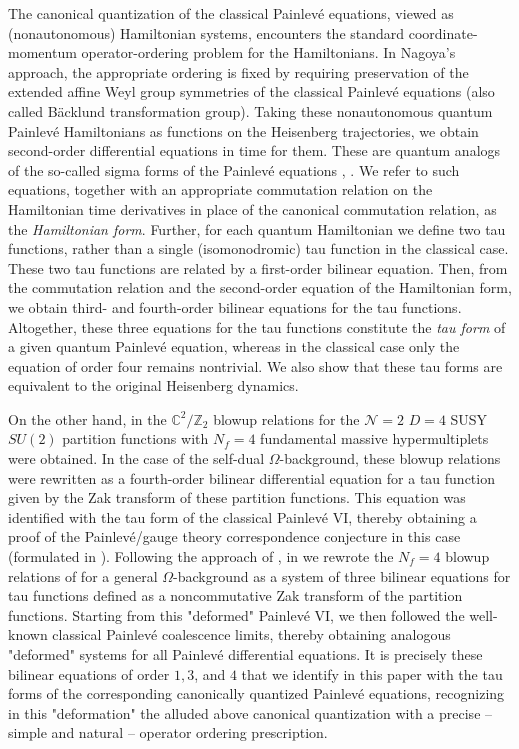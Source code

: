 \documentclass[12pt,a4paper]{article}
\numberwithin{equation}{section}
\begin{document}
The canonical quantization of the classical Painlev\'e equations, viewed as (nonautonomous) Hamiltonian systems, encounters the standard coordinate-momentum operator-ordering problem for the Hamiltonians. In Nagoya's approach, the appropriate ordering is fixed by requiring preservation of the extended affine Weyl group  symmetries of the classical Painlev\'e equations (also called B\"acklund transformation group). Taking these nonautonomous quantum Painlev\'e Hamiltonians as functions on the Heisenberg trajectories, we obtain second-order differential equations in time for them. These are quantum analogs of the so-called sigma forms of the Painlev\'e equations \cite{JM81}, \cite{Forrester_book}. We refer to such equations, together with an appropriate commutation relation on the Hamiltonian time derivatives in place of the canonical commutation relation, as the \textit{Hamiltonian form}. Further, for each quantum Hamiltonian we define two tau functions, rather than a single (isomonodromic) tau function in the classical case.
These two tau functions are related by a first-order bilinear equation. Then, from the commutation relation and the second-order equation of the Hamiltonian form, we obtain third- and fourth-order bilinear equations for the tau functions. Altogether, these three equations for the tau functions constitute the \textit{tau form} of a given quantum Painlev\'e equation, whereas in the classical case only the equation of order four remains nontrivial. We also show that these tau forms are equivalent to the original Heisenberg dynamics.

On the other hand, in \cite{BS14} the $\mathbb{C}^2/\mathbb{Z}_2$ blowup relations for the $\mathcal{N}=2$ $D=4$ SUSY $SU(2)$ partition functions with $N_f=4$ fundamental massive hypermultiplets were obtained.
In the case of the self-dual $\Omega$-background, these blowup relations were rewritten
as a fourth-order bilinear differential equation for a tau function given by the Zak transform of these partition functions.
This equation was identified with the tau form of the classical Painlev\'e VI, thereby obtaining a proof of the Painlev\'e/gauge theory correspondence conjecture in this case (formulated in \cite{GIL12}). Following the approach of \cite{BGM17}, in \cite{BST25} we rewrote the $N_f=4$ blowup relations of \cite{BS14} for a general $\Omega$-background as a system of three bilinear equations for tau functions defined as a noncommutative Zak transform of the partition functions. 
Starting from this "deformed" Painlev\'e VI, we then followed the well-known classical Painlev\'e coalescence limits, thereby obtaining analogous "deformed" systems for all Painlev\'e differential equations.
It is precisely these bilinear equations of order $1,3$, and $4$ that we identify in this paper with the tau forms of the corresponding canonically quantized Painlev\'e equations, recognizing in this "deformation" the alluded above canonical quantization with a precise -- simple and natural -- operator ordering prescription. 
\end{document}
